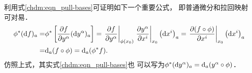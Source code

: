 利用式\eqref{chdm:eqn_pull-bases}可证明如下一个重要公式，
即普通微分和拉回映射可对易．
\begin{align}
    {\phi ^*} ({\rm d} f)_a =& {\phi ^*} \left[ \frac{ \partial f  } 
      {\partial y^\alpha} ({\rm d} y^\alpha)_a  \right]
    = \left. \frac{ \partial f }{\partial y^\alpha} \right|_{\phi(x_0)}
      \left. \frac{{\partial {y^\alpha }}}{{\partial {x^i}}} \right|_{x_0}
      \left( {{\rm{d}}{x^i }} \right)_a 
    = \left. \frac{ \partial (f \circ \phi) }{\partial x^i} \right|_{x_0}
      \left( {{\rm{d}}{x^i }} \right)_a  \notag\\
    =& {\rm d}_a (f \circ \phi) ={\rm d}_a ({\phi ^*}f) . \label{chdm:eqn_dfphi}
\end{align}
仿照上式，其实式\eqref{chdm:eqn_pull-bases}也
可以写为${\phi ^*} ({\rm d} y^\alpha)_a = {\rm d}_a (y^\alpha \circ \phi)$．

